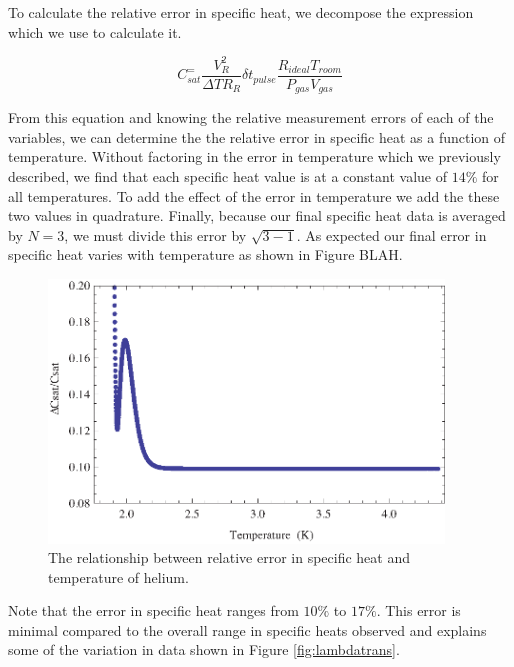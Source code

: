 To calculate the relative error in specific heat, we decompose the expression which we use to calculate it.

\begin{center}
\begin{equation}
C_{sat}^=\frac{V_{R}^{2}}{\Delta T R_{R}}\delta t_{pulse} \frac{R_{ideal}T_{room}}{P_{gas}V_{gas}}
\end{equation}
\end{center}

From this equation and knowing the relative measurement errors of each of the variables, we can determine the the relative error in specific heat as a function of temperature.  Without factoring in the error in temperature which we previously described, we find that each specific heat value is at a constant value of $14\%$ for all temperatures.  To add the effect of the error in temperature we add the these two values in quadrature.  Finally, because our final specific heat data is averaged by $N=3$, we must divide this error by $\sqrt{3-1}$. As expected our final error in specific heat varies with temperature as shown in Figure BLAH.

\begin{figure}[htbp]
\begin{center}
\includegraphics[height=70mm]{./figures/heatcaperror.eps}
\caption{\small{The relationship between relative error in specific heat and temperature of helium.}}
\label{fig:heatcaperror}
\end{center}
\end{figure}

Note that the error in specific heat ranges from $10\%$ to $17\%$.  This error is minimal compared to the overall range in specific heats observed and explains some of the variation in data shown in Figure \ref{fig:lambdatrans}.